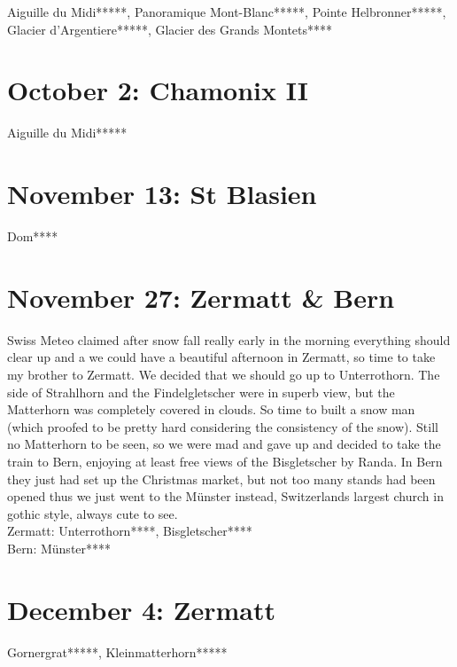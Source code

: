 Aiguille du Midi*****, Panoramique Mont-Blanc*****, Pointe Helbronner*****, Glacier d'Argentiere*****, Glacier des Grands Montets****

\section{October 2: Chamonix II}
\label{2010ChamonixII}

Aiguille du Midi*****

\section{November 13: St Blasien}
\label{2010StBlasien}

Dom****

\section{November 27: Zermatt \& Bern}
\label{2010ZermattBern}

Swiss Meteo claimed after snow fall really early in the morning everything should clear up and a we could have a beautiful afternoon in Zermatt, so time to take my brother to Zermatt. We decided that we should go up to Unterrothorn. The side of Strahlhorn and the Findelgletscher were in superb view, but the Matterhorn was completely covered in clouds. So time to built a snow man (which proofed to be pretty hard considering the consistency of the snow). Still no Matterhorn to be seen, so we were mad and gave up and decided to take the train to Bern, enjoying at least free views of the Bisgletscher by Randa. In Bern they just had set up the Christmas market, but not too many stands had been opened thus we just went to the M\"unster instead, Switzerlands largest church in gothic style, always cute to see.\\

Zermatt: Unterrothorn****, Bisgletscher****\\
Bern: M\"unster****

\section{December 4: Zermatt}
\label{2010ZermattII}

Gornergrat*****, Kleinmatterhorn*****